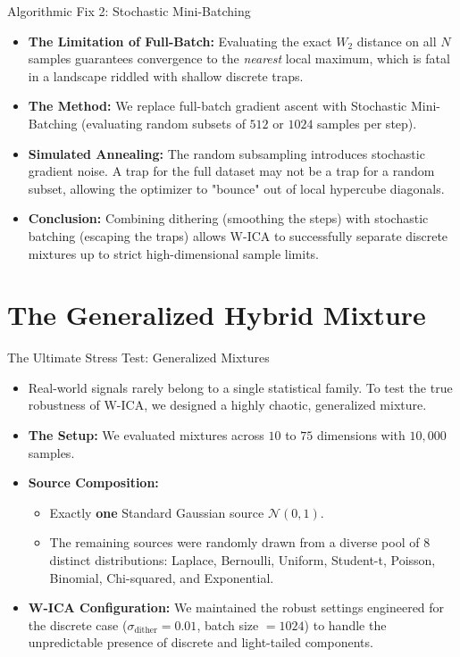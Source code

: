 \documentclass{beamer}
\begin{document}
\begin{frame}{Algorithmic Fix 2: Stochastic Mini-Batching}
  \begin{itemize}
    \item \textbf{The Limitation of Full-Batch:} Evaluating the exact $W_2$ distance on all $N$ samples guarantees convergence to the \textit{nearest} local maximum, which is fatal in a landscape riddled with shallow discrete traps.
    \item \textbf{The Method:} We replace full-batch gradient ascent with Stochastic Mini-Batching (evaluating random subsets of $512$ or $1024$ samples per step).
    \item \textbf{Simulated Annealing:} The random subsampling introduces stochastic gradient noise. A trap for the full dataset may not be a trap for a random subset, allowing the optimizer to "bounce" out of local hypercube diagonals.
    \item \textbf{Conclusion:} Combining dithering (smoothing the steps) with stochastic batching (escaping the traps) allows W-ICA to successfully separate discrete mixtures up to strict high-dimensional sample limits.
  \end{itemize}
\end{frame}



\section{The Generalized Hybrid Mixture}

\begin{frame}{The Ultimate Stress Test: Generalized Mixtures}
  \begin{itemize}
    \item Real-world signals rarely belong to a single statistical family. To test the true robustness of W-ICA, we designed a highly chaotic, generalized mixture.
    \item \textbf{The Setup:} We evaluated mixtures across $10$ to $75$ dimensions with $10,000$ samples.
    \item \textbf{Source Composition:} 
      \begin{itemize}
          \item Exactly \textbf{one} Standard Gaussian source $\mathcal{N}(0,1)$.
          \item The remaining sources were randomly drawn from a diverse pool of $8$ distinct distributions: Laplace, Bernoulli, Uniform, Student-t, Poisson, Binomial, Chi-squared, and Exponential.
      \end{itemize}
    \item \textbf{W-ICA Configuration:} We maintained the robust settings engineered for the discrete case ($\sigma_{\text{dither}} = 0.01$, batch size $= 1024$) to handle the unpredictable presence of discrete and light-tailed components.
  \end{itemize}
\end{frame}
\end{document}

